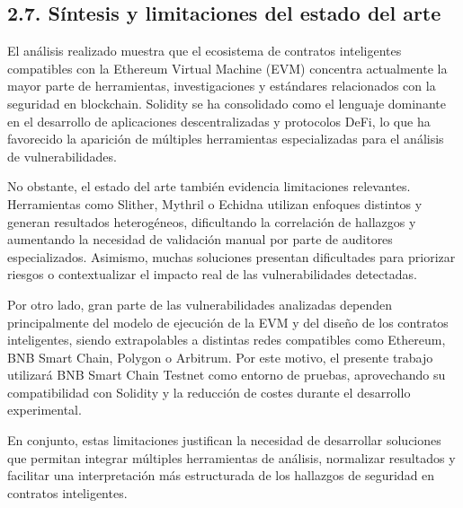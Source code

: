 \subsection{2.7. Síntesis y limitaciones del estado del
arte}\label{suxedntesis-y-limitaciones-del-estado-del-arte}

El análisis realizado muestra que el ecosistema de contratos
inteligentes compatibles con la Ethereum Virtual Machine (EVM) concentra
actualmente la mayor parte de herramientas, investigaciones y estándares
relacionados con la seguridad en blockchain. Solidity se ha consolidado
como el lenguaje dominante en el desarrollo de aplicaciones
descentralizadas y protocolos DeFi, lo que ha favorecido la aparición de
múltiples herramientas especializadas para el análisis de
vulnerabilidades.

No obstante, el estado del arte también evidencia limitaciones
relevantes. Herramientas como Slither, Mythril o Echidna utilizan
enfoques distintos y generan resultados heterogéneos, dificultando la
correlación de hallazgos y aumentando la necesidad de validación manual
por parte de auditores especializados. Asimismo, muchas soluciones
presentan dificultades para priorizar riesgos o contextualizar el
impacto real de las vulnerabilidades detectadas.

Por otro lado, gran parte de las vulnerabilidades analizadas dependen
principalmente del modelo de ejecución de la EVM y del diseño de los
contratos inteligentes, siendo extrapolables a distintas redes
compatibles como Ethereum, BNB Smart Chain, Polygon o Arbitrum. Por este
motivo, el presente trabajo utilizará BNB Smart Chain Testnet como
entorno de pruebas, aprovechando su compatibilidad con Solidity y la
reducción de costes durante el desarrollo experimental.

En conjunto, estas limitaciones justifican la necesidad de desarrollar
soluciones que permitan integrar múltiples herramientas de análisis,
normalizar resultados y facilitar una interpretación más estructurada de
los hallazgos de seguridad en contratos inteligentes.
